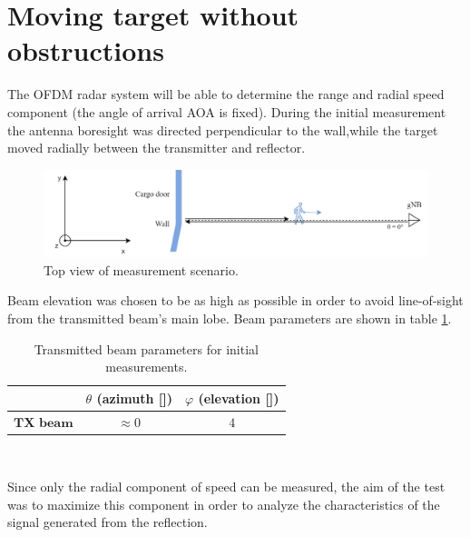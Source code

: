 \section{Moving target without obstructions}

The OFDM radar system will be able to determine the range and radial speed component (the angle of arrival AOA is fixed). During the initial measurement the antenna boresight was directed perpendicular to the wall,while the target moved radially between the transmitter and reflector.

\begin{figure}[H]
	\centering
	\includegraphics[width=1\textwidth]{Images/Test1/base-top_view}
	\caption{Top view of measurement scenario.}
	\label{fig:Test1_base-top_view}
\end{figure}


Beam elevation was chosen to be as high as possible in order to avoid line-of-sight from the transmitted beam's main lobe. Beam parameters are shown in table \ref{table:Test1TXBeamParams}.


\begin{table}[H]
	\centering 
	\begin{tabular}{|p{9em} c c |}
		\hline
		\rowcolor{bluepoli!40} %
		\textbf{} & \textbf{$\theta$ (azimuth [\textdegree])} & \textbf{$\varphi$ (elevation [\textdegree])} \T\B \\
		\hline \hline
		$\textbf{TX beam}$ & $\approx 0$ & $4$ \T\B \\
		
		\hline
	\end{tabular}
	\\[10pt]
	\caption{Transmitted beam parameters for initial measurements.}
	\label{table:Test1TXBeamParams}
\end{table}

Since only the radial component of speed can be measured, the aim of the test was to maximize this component in order to analyze the characteristics of the signal generated from the reflection.

